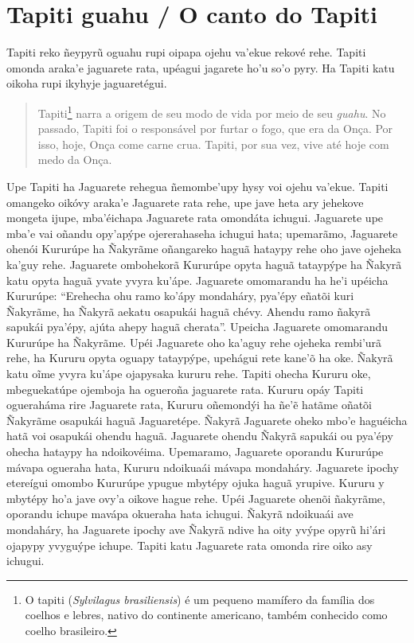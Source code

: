 \chapter{Tapiti guahu / O canto do Tapiti}

Tapiti reko ñeypyrũ oguahu rupi oipapa ojehu va'ekue rekové rehe. Tapiti
omonda araka'e jaguarete rata, upéagui jagarete ho'u so'o pyry. Ha
Tapiti katu oikoha rupi ikyhyje jaguaretégui.

\begin{quote}
Tapiti\footnote{O tapiti (\emph{Sylvilagus brasiliensis}) é um pequeno
  mamífero da família dos coelhos e lebres, nativo do continente
  americano, também conhecido como coelho brasileiro.} narra a origem de
seu modo de vida por meio de seu \emph{guahu}. No passado, Tapiti foi o
responsável por furtar o fogo, que era da Onça. Por isso, hoje, Onça
come carne crua. Tapiti, por sua vez, vive até hoje com medo da Onça.
\end{quote}

Upe Tapiti ha Jaguarete rehegua ñemombe'upy hysy voi ojehu va'ekue.
Tapiti omangeko oikóvy araka'e Jaguarete rata rehe, upe jave heta ary
jehekove mongeta ijupe, mba'éichapa Jaguarete rata omondáta ichugui.
Jaguarete upe mba'e vai oñandu opy'apýpe ojererahaseha ichugui hata;
upemarãmo, Jaguarete ohenói Kururúpe ha Ñakyrãme oñangareko haguã
hataypy rehe oho jave ojeheka ka'guy rehe. Jaguarete ombohekorã Kururúpe
opyta haguã tataypýpe ha Ñakyrã katu opyta haguã yvate yvyra ku'ápe.
Jaguarete omomarandu ha he'i upéicha Kururúpe: ``Erehecha ohu ramo
ko'ápy mondaháry, pya'épy eñatõi kuri Ñakyrãme, ha Ñakyrã aekatu
osapukái haguã chévy. Ahendu ramo ñakyrã sapukái pya'épy, ajúta ahepy
haguã cherata''. Upeicha Jaguarete omomarandu Kururúpe ha Ñakyrãme. Upéi
Jaguarete oho ka'aguy rehe ojeheka rembi'urã rehe, ha Kururu opyta
oguapy tataypýpe, upehágui rete kane'õ ha oke. Ñakyrã katu oĩme yvyra
ku'ápe ojapysaka kururu rehe. Tapiti ohecha Kururu oke, mbeguekatúpe
ojemboja ha ogueroña jaguarete rata. Kururu opáy Tapiti ogueraháma rire
Jaguarete rata, Kururu oñemondýi ha ñe'ẽ hatãme oñatõi Ñakyrãme osapukái
haguã Jaguaretépe. Ñakyrã Jaguarete oheko mbo'e haguéicha hatã voi
osapukái ohendu haguã. Jaguarete ohendu Ñakyrã sapukái ou pya'épy ohecha
hataypy ha ndoikovéima. Upemaramo, Jaguarete oporandu Kururúpe mávapa
ogueraha hata, Kururu ndoikuaái mávapa mondaháry. Jaguarete ipochy
etereígui omombo Kururúpe ypugue mbytépy ojuka haguã yrupive. Kururu y
mbytépy ho'a jave ovy'a oikove hague rehe. Upéi Jaguarete ohenõi
ñakyrãme, oporandu ichupe mavápa okueraha hata ichugui. Ñakyrã ndoikuaái
ave mondaháry, ha Jaguarete ipochy ave Ñakyrã ndive ha oity yvýpe opyrũ
hi'ári ojapypy yvyguýpe ichupe. Tapiti katu Jaguarete rata omonda rire
oiko asy ichugui.

